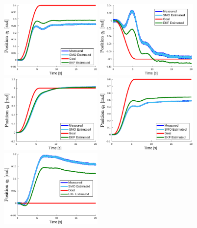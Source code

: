 \documentclass[smallextended]{svjour3}       %
\begin{document}
\begin{figure}
  \centering
  \includegraphics[width=0.45\textwidth]{Figures/result_q1.eps}
  \includegraphics[width=0.45\textwidth]{Figures/result_q2.eps}
  \includegraphics[width=0.45\textwidth]{Figures/result_q3.eps}
  \includegraphics[width=0.45\textwidth]{Figures/result_q4.eps}
  \includegraphics[width=0.45\textwidth]{Figures/result_q5.eps}

\end{figure}
\end{document}
